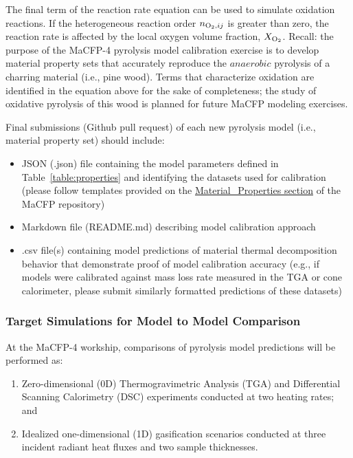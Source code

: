 \documentclass[12pt]{article}
\begin{document}

The final term of the reaction rate equation can be used to simulate oxidation reactions. If the heterogeneous reaction order $n_{{\rm O_2},ij}$ is greater than zero, the reaction rate is affected by the local oxygen volume fraction, $X_{\rm O_2}$. Recall: the purpose of the MaCFP-4 pyrolysis model calibration exercise is to develop material property sets that accurately reproduce the $anaerobic$ pyrolysis of a charring material (i.e., pine wood). Terms that characterize oxidation are identified in the equation above for the sake of completeness; the study of oxidative pyrolysis of this wood is planned for future MaCFP modeling exercises.

Final submissions (Github pull request) of each new pyrolysis model (i.e., material property set) should include:
\begin{itemize}[noitemsep]
\item JSON (.json) file containing the model parameters defined in Table~\ref{table:properties} and identifying the datasets used for calibration (please follow templates provided on the \href{https://github.com/MaCFP/matl-db/tree/master/Wood/Material_Properties}{Material\_Properties section} of the MaCFP repository)
\item Markdown file (README.md) describing model calibration approach
\item .csv file(s) containing model predictions of material thermal decomposition behavior that demonstrate proof of model calibration accuracy (e.g., if models were calibrated against mass loss rate measured in the TGA or cone calorimeter, please submit similarly formatted predictions of these datasets)
\end{itemize}

\subsubsection{Target Simulations for Model to Model Comparison}
At the MaCFP-4 workship, comparisons of pyrolysis model predictions will be performed as:
\begin{enumerate}
    \item  Zero-dimensional (0D) Thermogravimetric Analysis (TGA) and Differential Scanning Calorimetry (DSC) experiments conducted at two heating rates; and
    \item Idealized one-dimensional (1D) gasification scenarios conducted at three incident radiant heat fluxes and two sample thicknesses.
\end{enumerate}
 
\end{document}
